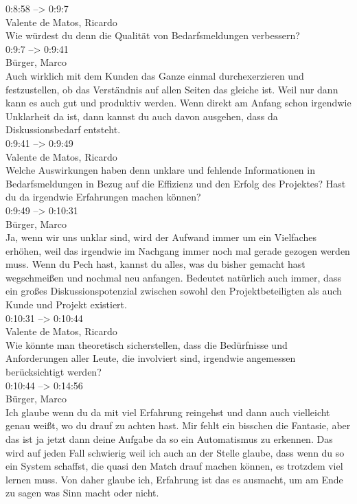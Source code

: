0:8:58 --> 0:9:7\\
Valente de Matos, Ricardo\\
Wie würdest du denn die Qualität von Bedarfsmeldungen verbessern?\\

0:9:7 --> 0:9:41\\
Bürger, Marco\\
Auch wirklich mit dem Kunden das Ganze einmal durchexerzieren und festzustellen, ob das Verständnis auf allen Seiten das gleiche ist. Weil nur dann kann es auch gut und produktiv werden. Wenn direkt am Anfang schon irgendwie Unklarheit da ist, dann kannst du auch davon ausgehen, dass da Diskussionsbedarf entsteht.\\

0:9:41 --> 0:9:49\\
Valente de Matos, Ricardo\\
Welche Auswirkungen haben denn unklare und fehlende Informationen in Bedarfsmeldungen in Bezug auf die Effizienz und den Erfolg des Projektes? Hast du da irgendwie Erfahrungen machen können?\\

0:9:49 --> 0:10:31\\
Bürger, Marco\\
Ja, wenn wir uns unklar sind, wird der Aufwand immer um ein Vielfaches erhöhen, weil das irgendwie im Nachgang immer noch mal gerade gezogen werden muss. Wenn du Pech hast, kannst du alles, was du bisher gemacht hast wegschmeißen und nochmal neu anfangen. Bedeutet natürlich auch immer, dass ein großes Diskussionspotenzial zwischen sowohl den Projektbeteiligten als auch Kunde und Projekt existiert.\\

0:10:31 --> 0:10:44\\
Valente de Matos, Ricardo\\
Wie könnte man theoretisch sicherstellen, dass die Bedürfnisse und Anforderungen aller Leute, die involviert sind, irgendwie angemessen berücksichtigt werden?\\

0:10:44 --> 0:14:56\\
Bürger, Marco\\
Ich glaube wenn du da mit viel Erfahrung reingehst und dann auch vielleicht genau weißt, wo du drauf zu achten hast. Mir fehlt ein bisschen die Fantasie, aber das ist ja jetzt dann deine Aufgabe da so ein Automatismus zu erkennen. Das wird auf jeden Fall schwierig weil ich auch an der Stelle glaube, dass wenn du so ein System schaffst, die quasi den Match drauf machen können, es trotzdem viel lernen muss. Von daher glaube ich, Erfahrung ist das es ausmacht, um am Ende zu sagen was Sinn macht oder nicht.\\

